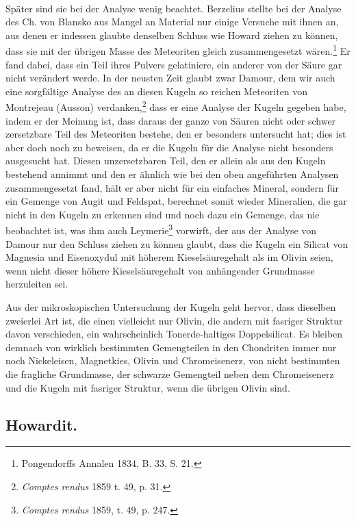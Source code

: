 \documentclass[a4paper, 11pt, oneside]{article}
\begin{document}
\paragraph{}
Später sind sie bei der Analyse wenig beachtet. Berzelius stellte bei der Analyse des Ch. von Blansko aus Mangel an Material nur einige Versuche mit ihnen an, aus denen er indessen glaubte denselben Schluss wie Howard ziehen zu können, dass sie mit der übrigen Masse des Meteoriten gleich zusammengesetzt wären.\footnote{Pongendorffs Annalen 1834, B. 33, S. 21.} Er fand dabei, dass ein Teil ihres Pulvers gelatiniere, ein anderer von der Säure gar nicht verändert werde. In der neusten Zeit glaubt zwar Damour, dem wir auch eine sorgfältige Analyse des an diesen Kugeln so reichen Meteoriten von Montrejeau (Ausson) verdanken,\footnote{\emph{Comptes rendus} 1859 t. 49, p. 31.} dass er eine Analyse der Kugeln gegeben habe, indem er der Meinung ist, dass daraus der ganze von Säuren nicht oder schwer zersetzbare Teil des Meteoriten bestehe, den er besonders untersucht hat; dies ist aber doch noch zu beweisen, da er die Kugeln für die Analyse nicht besonders ausgesucht hat. Diesen unzersetzbaren Teil, den er allein als aus den Kugeln bestehend annimmt und den er ähnlich wie bei den oben angeführten Analysen zusammengesetzt fand, hält er aber nicht für ein einfaches Mineral, sondern für ein Gemenge von Augit und Feldspat, berechnet somit wieder Mineralien, die gar nicht in den Kugeln zu erkennen sind und noch dazu ein Gemenge, das nie beobachtet ist, was ihm auch Leymerie\footnote{\emph{Comptes rendus} 1859, t. 49, p. 247.} vorwirft, der aus der Analyse von Damour nur den Schluss ziehen zu können glaubt, dass die Kugeln ein Silicat von Magnesia und Eisenoxydul mit höherem Kieselsäuregehalt als im Olivin seien, wenn nicht dieser höhere Kieselsäuregehalt von anhängender Grundmasse herzuleiten sei.

Aus der mikroskopischen Untersuchung der Kugeln geht hervor, dass dieselben zweierlei Art ist, die einen vielleicht nur Olivin, die andern mit fasriger Struktur davon verschieden, ein wahrscheinlich Tonerde-haltiges Doppelsilicat. Es bleiben demnach von wirklich bestimmten Gemengteilen in den Chondriten immer nur noch Nickeleisen, Magnetkies, Olivin und Chromeisenerz, von nicht bestimmten die fragliche Grundmasse, der schwarze Gemengteil neben dem Chromeisenerz und die Kugeln mit fasriger Struktur, wenn die übrigen Olivin sind.
\subsection{Howardit.}
\end{document}
